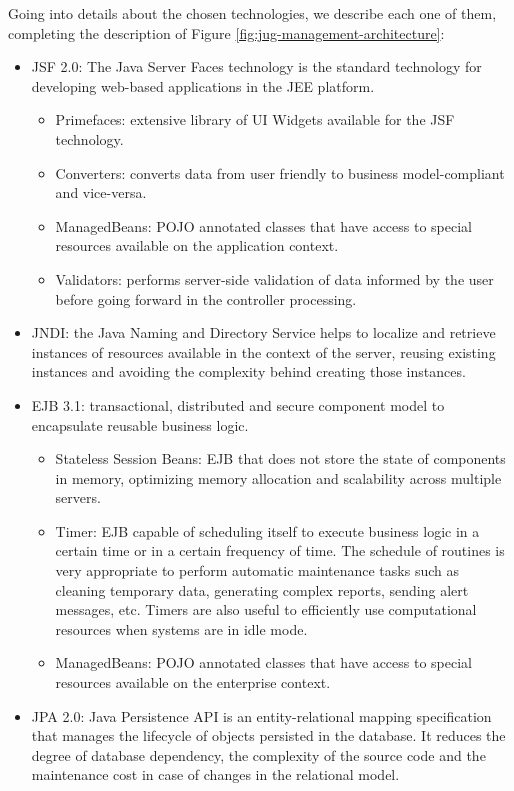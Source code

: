 \documentclass[10pt,a4paper]{report}
\begin{document}
Going into details about the chosen technologies, we describe each one of them, completing the description of Figure \ref{fig:jug-management-architecture}:
\begin{itemize}
\item JSF 2.0: The Java Server Faces technology is the standard technology for developing web-based applications in the JEE platform.
\begin{itemize}
\item Primefaces: extensive library of UI Widgets available for the JSF technology.
\item Converters: converts data from user friendly to business model-compliant and vice-versa.
\item ManagedBeans: POJO annotated classes that have access to special resources available on the application context.
\item Validators: performs server-side validation of data informed by the user before going forward in the controller processing.
\end{itemize}
\item JNDI: the Java Naming and Directory Service helps to localize and retrieve instances of resources available in the context of the server, reusing existing instances and avoiding the complexity behind creating those instances.
\item EJB 3.1: transactional, distributed and secure component model to encapsulate reusable business logic.
\begin{itemize}
\item Stateless Session Beans: EJB that does not store the state of components in memory, optimizing memory allocation and scalability across multiple servers.
\item Timer: EJB capable of scheduling itself to execute business logic in a certain time or in a certain frequency of time. The schedule of routines is very appropriate to perform automatic maintenance tasks such as cleaning temporary data, generating complex reports, sending alert messages, etc. Timers are also useful to efficiently use computational resources when systems are in idle mode.
\item ManagedBeans: POJO annotated classes that have access to special resources available on the enterprise context.
\end{itemize}
\item JPA 2.0: Java Persistence API is an entity-relational mapping specification that manages the lifecycle of objects persisted in the database. It reduces the degree of database dependency, the complexity of the source code and the maintenance cost in case of changes in the relational model.
\end{itemize}
\end{document}
